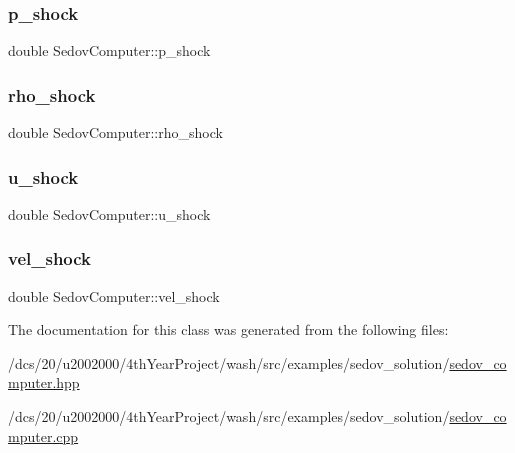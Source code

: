 \mbox{\label{classSedovComputer_aaca1a1a129526f6861d9c219a025ed56}} 
\subsubsection{\texorpdfstring{p\+\_\+shock}{p\_shock}}
{\footnotesize\ttfamily double Sedov\+Computer\+::p\+\_\+shock\hspace{0.3cm}{\ttfamily [static]}}

\mbox{\label{classSedovComputer_a3a79b1c2c435337f92488129f15ad323}} 
\subsubsection{\texorpdfstring{rho\+\_\+shock}{rho\_shock}}
{\footnotesize\ttfamily double Sedov\+Computer\+::rho\+\_\+shock\hspace{0.3cm}{\ttfamily [static]}}

\mbox{\label{classSedovComputer_a597b5c8321e0737b514ddb121844053d}} 
\subsubsection{\texorpdfstring{u\+\_\+shock}{u\_shock}}
{\footnotesize\ttfamily double Sedov\+Computer\+::u\+\_\+shock\hspace{0.3cm}{\ttfamily [static]}}

\mbox{\label{classSedovComputer_ac8e574be46eb693b095e85c5d157bffb}} 
\subsubsection{\texorpdfstring{vel\+\_\+shock}{vel\_shock}}
{\footnotesize\ttfamily double Sedov\+Computer\+::vel\+\_\+shock\hspace{0.3cm}{\ttfamily [static]}}



The documentation for this class was generated from the following files\+:\begin{DoxyCompactItemize}
\item 
/dcs/20/u2002000/4th\+Year\+Project/wash/src/examples/sedov\+\_\+solution/\mbox{\hyperlink{sedov__computer_8hpp}{sedov\+\_\+computer.\+hpp}}\item 
/dcs/20/u2002000/4th\+Year\+Project/wash/src/examples/sedov\+\_\+solution/\mbox{\hyperlink{sedov__computer_8cpp}{sedov\+\_\+computer.\+cpp}}\end{DoxyCompactItemize}
